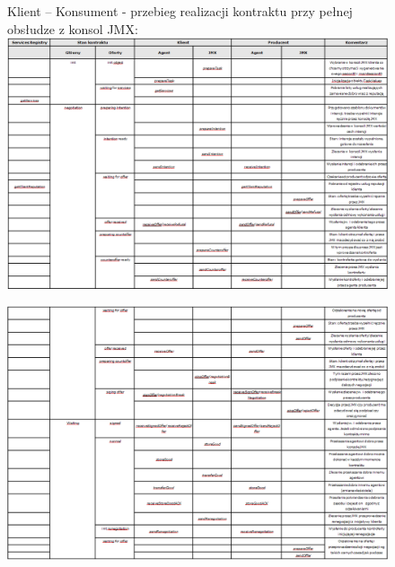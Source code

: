 \documentclass[a4paper,12pt]{article}
\begin{document}
\begin{landscape}

\begin{figure}[!h]
Klient – Konsument - przebieg realizacji kontraktu przy pełnej obsłudze z konsol JMX:
\centering
\includegraphics[width=24cm, keepaspectratio]{gfx/PlatformaWymianyDobr-img14.png}
\end{figure}

\begin{figure}[!h]
\centering
\includegraphics[width=24cm, keepaspectratio]{gfx/PlatformaWymianyDobr-img15.png}
\end{figure}


\end{landscape}
\end{document}
